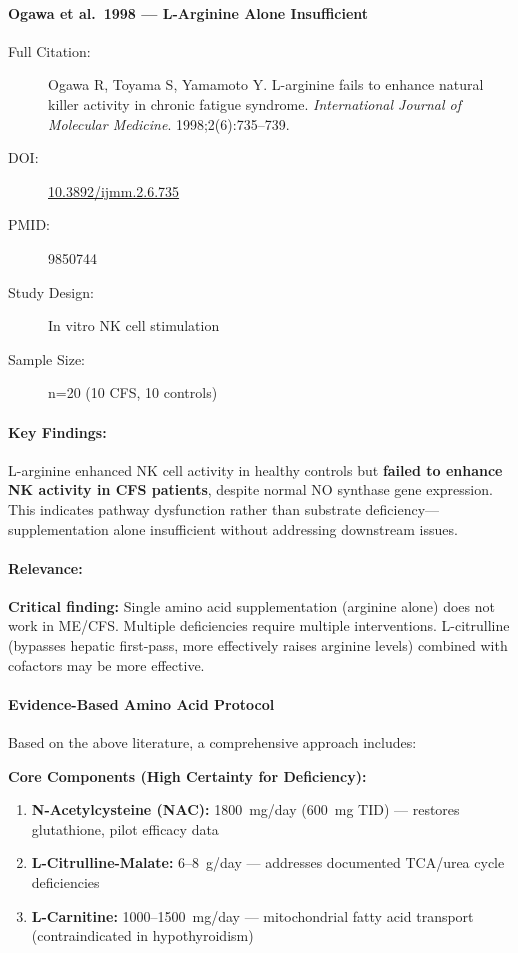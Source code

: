 \paragraph{Ogawa et al.\ 1998 --- L-Arginine Alone Insufficient}

\begin{description}
    \item[Full Citation:] Ogawa R, Toyama S, Yamamoto Y. L-arginine fails to enhance natural killer activity in chronic fatigue syndrome. \textit{International Journal of Molecular Medicine}. 1998;2(6):735--739.
    \item[DOI:] \href{https://doi.org/10.3892/ijmm.2.6.735}{10.3892/ijmm.2.6.735}
    \item[PMID:] 9850744
    \item[Study Design:] In vitro NK cell stimulation
    \item[Sample Size:] n=20 (10 CFS, 10 controls)
\end{description}

\paragraph{Key Findings:}
L-arginine enhanced NK cell activity in healthy controls but \textbf{failed to enhance NK activity in CFS patients}, despite normal NO synthase gene expression. This indicates pathway dysfunction rather than substrate deficiency---supplementation alone insufficient without addressing downstream issues.

\paragraph{Relevance:}
\textbf{Critical finding:} Single amino acid supplementation (arginine alone) does not work in ME/CFS. Multiple deficiencies require multiple interventions. L-citrulline (bypasses hepatic first-pass, more effectively raises arginine levels) combined with cofactors may be more effective.

\paragraph{Evidence-Based Amino Acid Protocol}

Based on the above literature, a comprehensive approach includes:

\textbf{Core Components (High Certainty for Deficiency):}
\begin{enumerate}
    \item \textbf{N-Acetylcysteine (NAC):} 1800~mg/day (600~mg TID) --- restores glutathione, pilot efficacy data
    \item \textbf{L-Citrulline-Malate:} 6--8~g/day --- addresses documented TCA/urea cycle deficiencies
    \item \textbf{L-Carnitine:} 1000--1500~mg/day --- mitochondrial fatty acid transport (contraindicated in hypothyroidism)
\end{enumerate}

